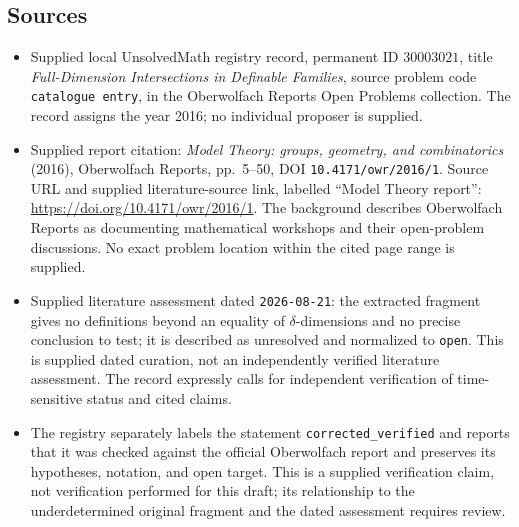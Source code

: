 \documentclass[11pt]{article}
\begin{document}
\subsection{Sources}
\begin{itemize}
\item Supplied local UnsolvedMath registry record, permanent ID \(30003021\), title \emph{Full-Dimension Intersections in Definable Families}, source problem code \texttt{catalogue entry}, in the Oberwolfach Reports Open Problems collection. The record assigns the year 2016; no individual proposer is supplied.
\item Supplied report citation: \emph{Model Theory: groups, geometry, and combinatorics} (2016), Oberwolfach Reports, pp.\ 5--50, DOI \texttt{10.4171/owr/2016/1}. Source URL and supplied literature-source link, labelled ``Model Theory report'': \url{https://doi.org/10.4171/owr/2016/1}. The background describes Oberwolfach Reports as documenting mathematical workshops and their open-problem discussions. No exact problem location within the cited page range is supplied.
\item Supplied literature assessment dated \texttt{2026-08-21}: the extracted fragment gives no definitions beyond an equality of \(\delta\)-dimensions and no precise conclusion to test; it is described as unresolved and normalized to \texttt{open}. This is supplied dated curation, not an independently verified literature assessment. The record expressly calls for independent verification of time-sensitive status and cited claims.
\item The registry separately labels the statement \texttt{corrected\_verified} and reports that it was checked against the official Oberwolfach report and preserves its hypotheses, notation, and open target. This is a supplied verification claim, not verification performed for this draft; its relationship to the underdetermined original fragment and the dated assessment requires review.
\end{itemize}
\end{document}
